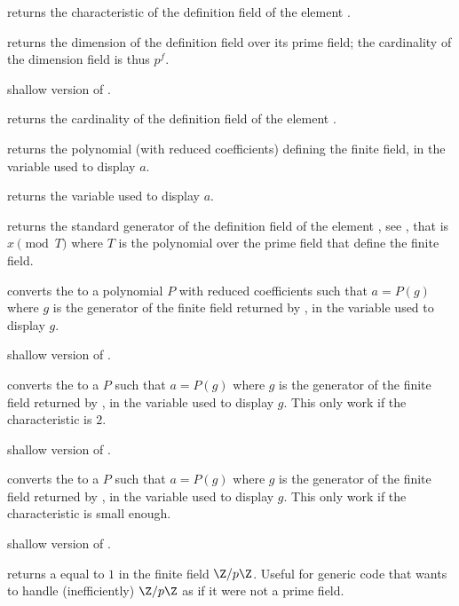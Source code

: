  returns the characteristic of the definition field of the
 element .

 returns the dimension of the definition field over
its prime field; the cardinality of the dimension field is thus $p^f$.

 shallow version of .

 returns the cardinality of the definition field of the
 element .

 returns the polynomial (with reduced 
coefficients) defining the finite field, in the variable used to display $a$.

 returns the variable used to display $a$.

 returns the standard generator of the definition field
of the  element , see , that is $x\pmod{T}$ where
$T$ is the polynomial over the prime field that define the finite field.

 converts the   to a polynomial
$P$ with reduced  coefficients such that $a=P(g)$ where $g$ is the
generator of the finite field returned by , in the variable used to
display $g$.

 shallow version of .

 converts the   to a 
$P$ such that $a=P(g)$ where $g$ is the generator of the finite field returned
by , in the variable used to display $g$. This only work if the
characteristic is $2$.

 shallow version of .

 converts the   to a 
$P$ such that $a=P(g)$ where $g$ is the generator of the finite field returned
by , in the variable used to display $g$. This only work if the
characteristic is small enough.

 shallow version of .

 returns a  equal to $1$ in the
finite field $\Z/p\Z$. Useful for generic code that wants to handle
(inefficiently) $\Z/p\Z$ as if it were not a prime field.

